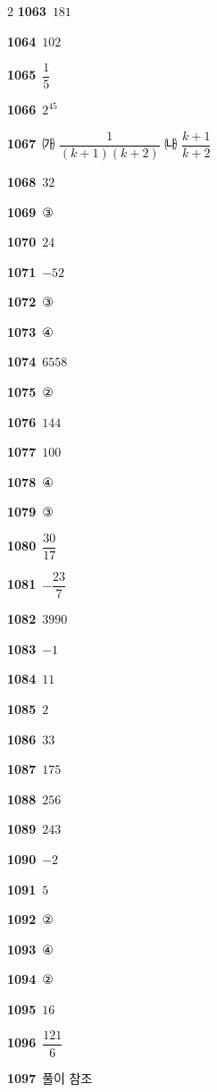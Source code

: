 \documentclass[10pt,a4paper]{article}
\begin{document}
\begin{multicols}{2}
\noindent\textbf{1063}\ $181$\par
\noindent\textbf{1064}\ $102$\par
\noindent\textbf{1065}\ $\dfrac{1}{5}$\par
\noindent\textbf{1066}\ $2^{45}$\par
\noindent\textbf{1067}\ ㈎ $\dfrac{1}{(k+1)(k+2)}$ \quad ㈏ $\dfrac{k+1}{k+2}$\par
\noindent\textbf{1068}\ $32$\par
\noindent\textbf{1069}\ ③\par
\noindent\textbf{1070}\ $24$\par
\noindent\textbf{1071}\ $-52$\par
\noindent\textbf{1072}\ ③\par
\noindent\textbf{1073}\ ④\par
\noindent\textbf{1074}\ $6558$\par
\noindent\textbf{1075}\ ②\par
\noindent\textbf{1076}\ $144$\par
\noindent\textbf{1077}\ $100$\par
\noindent\textbf{1078}\ ④\par
\noindent\textbf{1079}\ ③\par
\noindent\textbf{1080}\ $\dfrac{30}{17}$\par
\noindent\textbf{1081}\ $-\dfrac{23}{7}$\par
\noindent\textbf{1082}\ $3990$\par
\noindent\textbf{1083}\ $-1$\par
\noindent\textbf{1084}\ $11$\par
\noindent\textbf{1085}\ $2$\par
\noindent\textbf{1086}\ $33$\par
\noindent\textbf{1087}\ $175$\par
\noindent\textbf{1088}\ $256$\par
\noindent\textbf{1089}\ $243$\par
\noindent\textbf{1090}\ $-2$\par
\noindent\textbf{1091}\ $5$\par
\noindent\textbf{1092}\ ②\par
\noindent\textbf{1093}\ ④\par
\noindent\textbf{1094}\ ②\par
\noindent\textbf{1095}\ $16$\par
\noindent\textbf{1096}\ $\dfrac{121}{6}$\par
\noindent\textbf{1097}\ 풀이 참조\par

\end{multicols}
\end{document}

